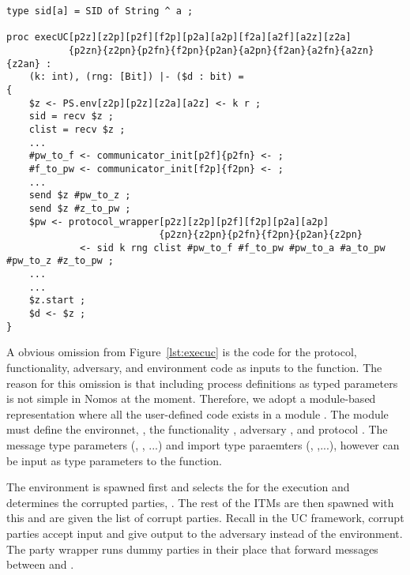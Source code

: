 \begin{figure*}
\begin{lstlisting}[basicstyle=\small\ttfamily]
type sid[a] = SID of String ^ a ;

proc execUC[p2z][z2p][p2f][f2p][p2a][a2p][f2a][a2f][a2z][z2a]
           {p2zn}{z2pn}{p2fn}{f2pn}{p2an}{a2pn}{f2an}{a2fn}{a2zn}{z2an} : 
    (k: int), (rng: [Bit]) |- ($d : bit) = 
{
    $z <- PS.env[z2p][p2z][z2a][a2z] <- k r ;
    sid = recv $z ;
    clist = recv $z ;
    ...
    #pw_to_f <- communicator_init[p2f]{p2fn} <- ;
	#f_to_pw <- communicator_init[f2p]{f2pn} <- ;
	...
	send $z #pw_to_z ;
	send $z #z_to_pw ;
	$pw <- protocol_wrapper[p2z][z2p][p2f][f2p][p2a][a2p]
                           {p2zn}{z2pn}{p2fn}{f2pn}{p2an}{z2pn} 
             <- sid k rng clist #pw_to_f #f_to_pw #pw_to_a #a_to_pw #pw_to_z #z_to_pw ;
	...
	...
    $z.start ;
    $d <- $z ;
}
\end{lstlisting}
\caption{The  function spawns all the necessary ITMs in the UC execution: the environment, the protocol wrapper, the functionality, and the adversary. Each is parameterized with a security parameter $k$ and a uniformly random bit string $\msf{rng} \in \{0,1\}^{poly(k)}$. At the end, the environment is initiated and it returns a bit $b$ which is its guess for which world it is in. The full code can be found in the Appendix.}
\label{lst:execuc}
\end{figure*}
A obvious omission from Figure~\ref{lst:execuc} is the code for the protocol, functionality, adversary, and environment code as inputs to the function.
The reason for this omission is that including process definitions as typed parameters is not simple in Nomos at the moment.
Therefore, we adopt a module-based representation where all the user-defined code exists in a module .
The module must define the environnet, , the functionality , adversary , and protocol .
The message type parameters (, , ...) and import type paraemters (, ,...), however can be input as type parameters to the function.

The environment is spawned first and selects the  for the execution and determines the corrupted parties, .
The rest of the ITMs are then spawned with this  and are given the list of corrupt parties.
Recall in the UC framework, corrupt parties accept input and give output to the adversary instead of the environment.
The party wrapper runs dummy parties in their place that forward messages between \Adversary and \F.

